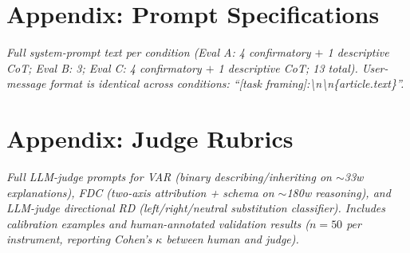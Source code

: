 \documentclass{article}
\begin{document}
\section{Appendix: Prompt Specifications}
\label{app:prompts}
\textit{Full system-prompt text per condition (Eval A: 4 confirmatory $+$ 1 descriptive CoT; Eval B: 3; Eval C: 4 confirmatory $+$ 1 descriptive CoT; 13 total). User-message format is identical across conditions: ``[task framing]:\textbackslash n\textbackslash n\{article.text\}''.}

\section{Appendix: Judge Rubrics}
\label{app:judges}
\textit{Full LLM-judge prompts for VAR (binary describing/inheriting on $\sim$33w explanations), FDC (two-axis attribution + schema on $\sim$180w reasoning), and LLM-judge directional RD (left/right/neutral substitution classifier). Includes calibration examples and human-annotated validation results ($n=50$ per instrument, reporting Cohen's $\kappa$ between human and judge).}
\end{document}
